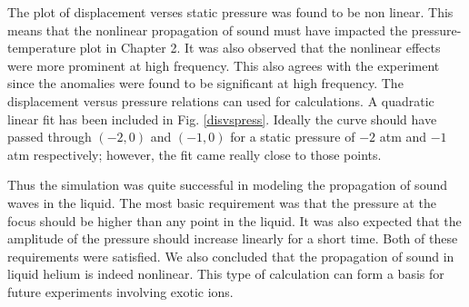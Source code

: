 The plot of displacement verses static pressure was found to be non linear. This means that the nonlinear propagation of sound must have impacted the pressure-temperature plot in Chapter 2. It was also observed that the nonlinear effects were more prominent at high frequency. This also agrees with the experiment since the anomalies were found to be significant at high frequency. The displacement versus pressure relations can used for calculations. A quadratic linear fit has been included in Fig. \ref{disvspress}. Ideally the curve should have passed through $(-2,0)$ and $(-1,0)$ for a static pressure of $-2$ atm and $-1$ atm respectively; however, the fit came really close to those points. 

Thus the simulation was quite successful in modeling the propagation of sound waves in the liquid. The most basic requirement was that the pressure at the focus should be higher than any point in the liquid. It was also expected that the amplitude of the pressure should increase linearly for a short time. Both of these requirements were satisfied. We also concluded that the propagation of sound in liquid helium is indeed nonlinear. This type of calculation can form a basis for future experiments involving exotic ions.

